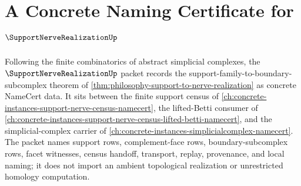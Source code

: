 \chapter{A Concrete Naming Certificate for $\SupportNerveRealizationUp$}
\label{ch:concrete-instances-support-nerve-realization-namecert}

Following the finite combinatorics of abstract simplicial complexes, the $\SupportNerveRealizationUp$ packet records the support-family-to-boundary-subcomplex theorem of \autoref{thm:philosophy-support-to-nerve-realization} as concrete NameCert data. It sits between the finite support census of \autoref{ch:concrete-instances-support-nerve-census-namecert}, the lifted-Betti consumer of \autoref{ch:concrete-instances-support-nerve-census-lifted-betti-namecert}, and the simplicial-complex carrier of \autoref{ch:concrete-instances-simplicialcomplex-namecert}. The packet names support rows, complement-face rows, boundary-subcomplex rows, facet witnesses, census handoff, transport, replay, provenance, and local naming; it does not import an ambient topological realization or unrestricted homology computation.

